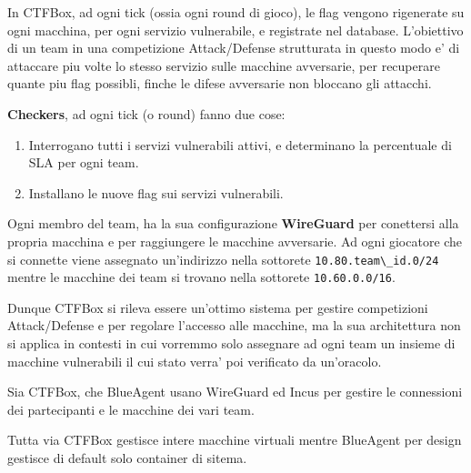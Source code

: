 In CTFBox, ad ogni tick (ossia ogni round di gioco), le flag vengono
rigenerate su ogni macchina, per ogni servizio vulnerabile, e registrate
nel database. L'obiettivo di un team in una competizione Attack/Defense
strutturata in questo modo e' di attaccare piu volte lo stesso servizio
sulle macchine avversarie, per recuperare quante piu flag possibli,
finche le difese avversarie non bloccano gli attacchi.

\textbf{Checkers}, ad ogni tick (o round) fanno due cose:

\begin{enumerate}
\def\labelenumi{\arabic{enumi}.}
\tightlist
\item
  Interrogano tutti i servizi vulnerabili attivi, e determinano la
  percentuale di SLA per ogni team.
\item
  Installano le nuove flag sui servizi vulnerabili.
\end{enumerate}

Ogni membro del team, ha la sua configurazione \textbf{WireGuard} per
conettersi alla propria macchina e per raggiungere le macchine
avversarie. Ad ogni giocatore che si connette viene assegnato
un'indirizzo nella sottorete
\passthrough{\lstinline!10.80.team\_id.0/24!} mentre le macchine dei
team si trovano nella sottorete \passthrough{\lstinline!10.60.0.0/16!}.

Dunque CTFBox si rileva essere un'ottimo sistema per gestire
competizioni Attack/Defense e per regolare l'accesso alle macchine, ma
la sua architettura non si applica in contesti in cui vorremmo solo
assegnare ad ogni team un insieme di macchine vulnerabili il cui stato
verra' poi verificato da un'oracolo.

Sia CTFBox, che BlueAgent usano WireGuard ed Incus per gestire le
connessioni dei partecipanti e le macchine dei vari team.

Tutta via CTFBox gestisce intere macchine virtuali mentre BlueAgent per
design gestisce di default solo container di sitema.
